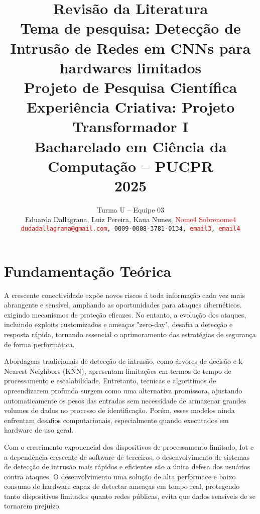 \documentclass[conference]{IEEEtran}
\newcommand\red[1]{{\textcolor{red}{#1}}}
\begin{document}

\title{Revisão da Literatura\\
\vspace{0.4cm}
Tema de pesquisa: Detecção de Intrusão de Redes em CNNs para hardwares limitados\\
\vspace{0.4cm}
{\Large Projeto de Pesquisa Científica\\
Experiência Criativa: Projeto Transformador I\\
Bacharelado em Ciência da Computação -- PUCPR\\
2025}}

\author{
    Turma U -- Equipe 03 \\
    Eduarda Dallagrana,  Luiz Pereira, Kaua Nunes, \red{Nome4 Sobrenome4} \\
    {\tt\small \red{dudadallagrana@gmail.com}, 0009-0008-3781-0134, \red{email3}, \red{email4}}
}
\maketitle


\section{Fundamentação Teórica}

A crescente conectividade expõe novos riscos á toda informação cada vez mais abrangente e sensível, ampliando as oportunidades para ataques cibernéticos. exigindo mecanismos de proteção eficazes. No entanto, a evolução dos ataques, incluindo exploits customizados e ameaças "zero-day", desafia a detecção e resposta rápida, tornando essencial o aprimoramento das estratégias de segurança de forma performática.

Abordagens tradicionais de detecção de intrusão, como árvores de decisão e k-Nearest Neighbors (KNN), apresentam limitações em termos de tempo de processamento e escalabilidade. Entretanto, tecnicas e algoritimos de apreendizarem profunda surgem como uma alternativa promissora, ajustando automaticamente os pesos das entradas sem necessidade de armazenar grandes volumes de dados no processo de identificação. Porém, esses modelos ainda enfrentam desafios computacionais, especialmente quando executados em hardware de uso geral.

Com o crescimento exponencial dos dispositivos de processamento limitado, Iot e a dependência crescente de software de terceiros, o desenvolvimento de sistemas de detecção de intrusão mais rápidos e eficientes são a única defesa dos usuários contra ataques. O desenvolvimento uma solução de alta performace e baixo consumo de hardware capaz de detectar ameaças em tempo real, protegendo tanto dispositivos limitados quanto redes públicas, evita que dados sensíveis de se tornarem prejuízo.
\end{document}
